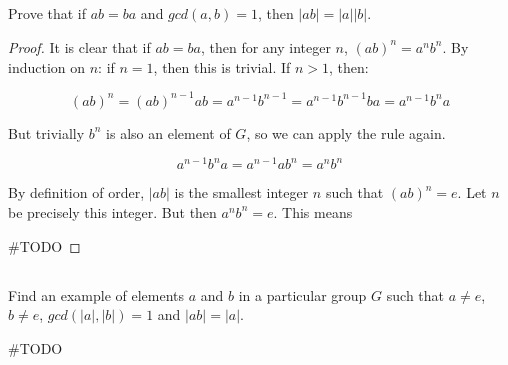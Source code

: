 \documentclass[a4paper,12pt]{article}
\begin{document}
\subsection{}

Prove that if $ab = ba$ and $gcd(a, b) = 1$, then $|ab| = |a||b|$.

\begin{proof}
It is clear that if $ab = ba$, then for any integer $n$, $(ab)^n = a^nb^n$. By induction on $n$: if $n = 1$, then this is trivial. If $n > 1$, then:

\begin{equation}
(ab)^n = (ab)^{n-1}ab = a^{n - 1}b^{n - 1} = a^{n - 1}b^{n-1}ba = a^{n - 1}b^na
\end{equation}

But trivially $b^n$ is also an element of $G$, so we can apply the rule again.

\begin{equation}
a^{n - 1}b^na = a^{n-1}ab^n = a^nb^n
\end{equation}

By definition of order, $|ab|$ is the smallest integer $n$ such that $(ab)^n = e$. Let $n$ be precisely this integer. But then $a^nb^n = e$. This means 

\#TODO
\end{proof}

\subsection{}

Find an example of elements $a$ and $b$ in a particular group $G$ such that $a \neq e$,
$b \neq e$, $gcd(|a|, |b|) = 1$ and $|ab| = |a|$.

\#TODO
\end{document}
